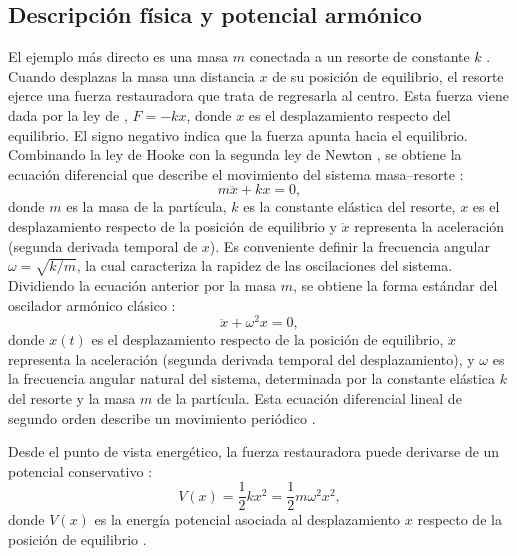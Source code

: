 \subsection{Descripción física y potencial armónico}
El ejemplo más directo es una masa $m$ conectada a un resorte de constante $k$ \citep{hooke1678, newton1687}. Cuando desplazas la masa una distancia $x$ de su posición de equilibrio, el resorte ejerce una fuerza restauradora que trata de regresarla al centro. Esta fuerza viene dada por la ley de \cite{hooke1678}, $F = -kx$, donde $x$ es el desplazamiento respecto del equilibrio. El signo negativo indica que la fuerza apunta hacia el equilibrio. Combinando la ley de Hooke \citep{hooke1678} con la segunda ley de Newton \citep{newton1687}, se obtiene la ecuación diferencial que describe el movimiento del sistema masa–resorte \citep{newton1687}:
\vspace{-10pt}	
\begin{equation}
	m\ddot{x} + kx = 0,
\end{equation}
donde $m$ es la masa de la partícula, $k$ es la constante elástica del resorte, $x$ es el desplazamiento respecto de la posición de equilibrio y $\ddot{x}$ representa la aceleración (segunda derivada temporal de $x$). Es conveniente definir la frecuencia angular $\omega = \sqrt{k/m}$, la cual caracteriza la rapidez de las oscilaciones del sistema. Dividiendo la ecuación anterior por la masa $m$, se obtiene la forma estándar del oscilador armónico clásico \citep{newton1687}:
\vspace{-10pt}	
\begin{equation}
	\ddot{x} + \omega^2 x = 0,
\end{equation}
donde $x(t)$ es el desplazamiento respecto de la posición de equilibrio, $\ddot{x}$ representa la aceleración (segunda derivada temporal del desplazamiento), y $\omega$ es la frecuencia angular natural del sistema, determinada por la constante elástica $k$ del resorte y la masa $m$ de la partícula. Esta ecuación diferencial lineal de segundo orden describe un movimiento periódico \citep{newton1687}.

Desde el punto de vista energético, la fuerza restauradora puede derivarse de un potencial conservativo \citep{hooke1678, newton1687}:
\vspace{-5pt}	
\begin{equation}
	V(x) = \frac{1}{2} k x^2 = \frac{1}{2} m\omega^2 x^2,
\end{equation} donde $V(x)$ es la energía potencial asociada al desplazamiento $x$ respecto de la posición de equilibrio \citep{hooke1678}.

